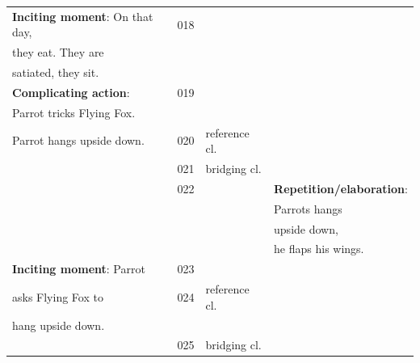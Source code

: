 \documentclass[output=paper]{LSP/langsci}
\begin{document}
\begin{table}[]
\begin{tabular}{llll}
\textbf{Inciting moment}: On that day,               & 018               &                 &                                              \\
they eat. They are                                      &                   &                 &                                              \\
satiated, they sit.                    &                   &                 &                                              \\
\textbf{Complicating action}:                         & 019               &                 &                                              \\
Parrot tricks Flying Fox.                      &                   &                 &                                              \\
Parrot hangs upside down.                            & 020               & reference cl.                &                                              \\
                                                 & 021               & bridging cl. &                                              \\
                                                 & 022          &                 & \textbf{Repetition/elaboration}:       \\
                                          &                   &                 & Parrots  hangs               \\
                                            &                   &                 & upside down,               \\                                        
                                                        &                   &                 & he flaps his wings.              \\                                                                      
\textbf{Inciting moment}: Parrot                    & 023          &                 &                                              \\
asks Flying Fox to                        &         024          &  reference cl.               &                                              \\
hang upside down.                         &                   &                 &                                              \\
                                       & 025               & bridging cl. &                                              \\

\end{tabular}
\end{table}
\end{document}

